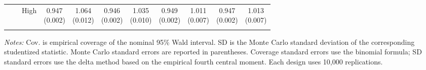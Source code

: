 \begin{table}[!t]
\begin{tabular}{lllcccccccc}
 &  & High & \shortstack{0.947\\[-1pt]\scriptsize(0.002)} & \shortstack{1.064\\[-1pt]\scriptsize(0.012)} & \shortstack{0.946\\[-1pt]\scriptsize(0.002)} & \shortstack{1.035\\[-1pt]\scriptsize(0.010)} & \shortstack{0.949\\[-1pt]\scriptsize(0.002)} & \shortstack{1.011\\[-1pt]\scriptsize(0.007)} & \shortstack{0.947\\[-1pt]\scriptsize(0.002)} & \shortstack{1.013\\[-1pt]\scriptsize(0.007)}\\
\addlinespace[1pt]
\bottomrule
\end{tabular}
\begin{minipage}{0.98\textwidth}\footnotesize\vspace{2pt}
\textit{Notes:} Cov. is empirical coverage of the nominal 95\% Wald interval. SD is the Monte Carlo standard deviation of the corresponding studentized statistic. Monte Carlo standard errors are reported in parentheses. Coverage standard errors use the binomial formula; SD standard errors use the delta method based on the empirical fourth central moment. Each design uses 10,000 replications.
\end{minipage}
\end{table}
